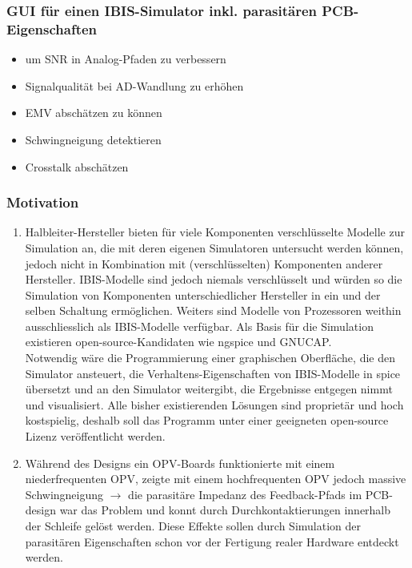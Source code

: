 \documentclass{article}
\begin{document}
\pagestyle{empty}
\subsubsection*{GUI für einen IBIS-Simulator inkl. parasitären PCB-Eigenschaften}

\begin{itemize}
	\item um SNR in Analog-Pfaden zu verbessern
	\item Signalqualität bei AD-Wandlung zu erhöhen
	\item EMV abschätzen zu können
	\item Schwingneigung detektieren
	\item Crosstalk abschätzen
\end{itemize}

\subsubsection*{Motivation} 
\begin{enumerate} 
\item Halbleiter-Hersteller bieten für viele Komponenten verschlüsselte Modelle zur Simulation an, die mit deren eigenen Simulatoren untersucht werden können, jedoch nicht in Kombination mit (verschlüsselten) Komponenten anderer Hersteller. IBIS-Modelle sind jedoch niemals verschlüsselt und würden so die Simulation von Komponenten unterschiedlicher Hersteller in ein und der selben Schaltung ermöglichen. Weiters sind Modelle von Prozessoren weithin ausschliesslich als IBIS-Modelle verfügbar. Als Basis für die Simulation existieren open-source-Kandidaten wie ngspice und GNUCAP. \\
Notwendig wäre die Programmierung einer graphischen Oberfläche, die den Simulator ansteuert, die Verhaltens-Eigenschaften von IBIS-Modelle in spice übersetzt und an den Simulator weitergibt, die Ergebnisse entgegen nimmt und visualisiert. Alle bisher existierenden Lösungen sind proprietär und hoch kostspielig, deshalb soll das Programm unter einer geeigneten open-source Lizenz veröffentlicht werden.
\item Während des Designs ein OPV-Boards funktionierte mit einem niederfrequenten OPV, zeigte mit einem hochfrequenten OPV jedoch massive Schwingneigung $\rightarrow$ die parasitäre Impedanz des Feedback-Pfads im PCB-design war das Problem und konnt durch Durchkontaktierungen innerhalb der Schleife gelöst werden. Diese Effekte sollen durch Simulation der parasitären Eigenschaften schon vor der Fertigung realer Hardware entdeckt werden.
\end{enumerate}
\end{document}
